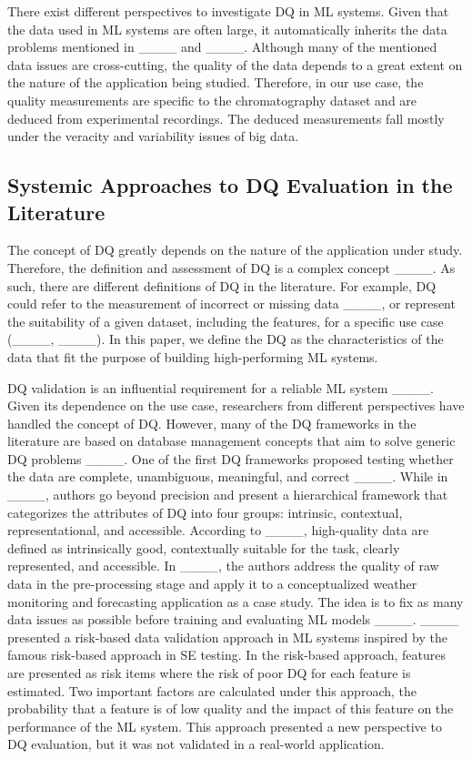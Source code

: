 There exist different perspectives to investigate DQ in ML systems. Given that the data used in ML systems are often large, it automatically inherits the data problems mentioned in ____ and ____. Although many of the mentioned data issues are cross-cutting, the quality of the data depends to a great extent on the nature of the application being studied. Therefore, in our use case, the quality measurements are specific to the chromatography dataset and are deduced from experimental recordings. The deduced measurements fall mostly under the veracity and variability issues of big data.

\subsection{Systemic Approaches to DQ Evaluation in the Literature}\label{sec:DQapproaches}
The concept of DQ greatly depends on the nature of the application under study. Therefore, the definition and assessment of DQ is a complex concept ____. As such, there are different definitions of DQ in the literature. For example, DQ could refer to the measurement of incorrect or missing data ____, or represent the suitability of a given dataset, including the features, for a specific use case (____, ____). In this paper, we define the DQ as the characteristics of the data that fit the purpose of building high-performing ML systems.

DQ validation is an influential requirement for a reliable ML system ____. Given its dependence on the use case, researchers from different perspectives have handled the concept of DQ. However, many of the DQ frameworks in the literature are based on database management concepts that aim to solve generic DQ problems ____. One of the first DQ frameworks proposed testing whether the data are complete, unambiguous, meaningful, and correct ____. While in ____, authors go beyond precision and present a hierarchical framework that categorizes the attributes of DQ into four groups: intrinsic, contextual, representational, and accessible. According to ____, high-quality data are defined as intrinsically good, contextually suitable for the task, clearly represented, and accessible. In ____, the authors address the quality of raw data in the pre-processing stage and apply it to a conceptualized weather monitoring and forecasting application as a case study. The idea is to fix as many data issues as possible before training and evaluating ML models ____. ____ presented a risk-based data validation approach in ML systems inspired by the famous risk-based approach in SE testing. In the risk-based approach, features are presented as risk items where the risk of poor DQ for each feature is estimated. Two important factors are calculated under this approach, the probability that a feature is of low quality and the impact of this feature on the performance of the ML system. This approach presented a new perspective to DQ evaluation, but it was not validated in a real-world application. 

